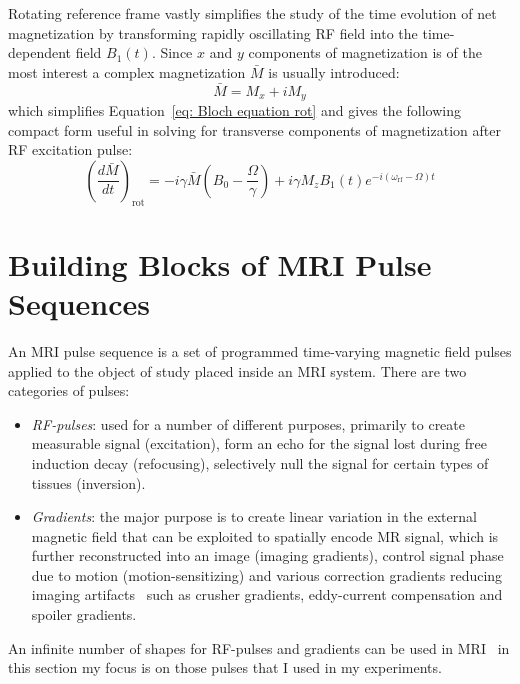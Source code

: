 Rotating reference frame vastly simplifies the study of the time evolution of net magnetization by transforming rapidly oscillating RF field into the time-dependent field $B_1(t)$. 
Since $x$ and $y$ components of magnetization is of the most interest a complex magnetization $\bar{M}$ is usually introduced:
\begin{equation}\label{eq: Transverse magnetization}
	\bar{M}=M_x+iM_y
\end{equation}
which simplifies Equation~\ref{eq: Bloch equation rot} and gives the following compact form useful in solving for transverse components of magnetization after RF excitation pulse:
\begin{equation}\label{eq: Bloch transverse}
	\left(\frac{d\bar{M}}{dt}\right)_\mathrm{rot}=-i\gamma\bar{M}\left(B_0-\frac{\Omega}{\gamma}\right)+i\gamma M_z
B_1(t)e^{-i(\omega_{\mathrm{rf}}-\Omega)t}
\end{equation}
\section{Building Blocks of MRI Pulse Sequences}
An MRI pulse sequence is a set of programmed time-varying magnetic field pulses applied to the object of study placed inside an MRI system. 
There are two categories of pulses: 
\begin{itemize}
\item \textit{RF-pulses}: used for a number of different purposes, primarily to create measurable signal (excitation), form an echo for the signal lost during free induction decay (refocusing), selectively null the signal for certain types of tissues (inversion).
\item \textit{Gradients}: the major purpose is to create linear variation in the external magnetic field that can be exploited to spatially encode MR signal, which is further reconstructed into an image (imaging gradients), control signal phase due to motion (motion-sensitizing) and various correction gradients reducing imaging artifacts~\cite{RNDT24} such as crusher gradients, eddy-current compensation and spoiler gradients. 
\end{itemize}
An infinite number of shapes for RF-pulses and gradients can be used in MRI~\cite{RNDT24, Brown:2014uy} in this section my focus is on those pulses that I used in my experiments.
